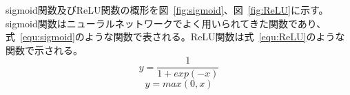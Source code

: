 sigmoid関数及びReLU関数の概形を図~\ref{fig:sigmoid}、図~\ref{fig:ReLU}に示す。sigmoid関数はニューラルネットワークでよく用いられてきた関数であり、式~\eqref{equ:sigmoid}のような関数で表される。ReLU関数は式~\eqref{equ:ReLU}のような関数で示される。
\begin{equation}
    y = \frac{1}{1+exp(-x)}
    \label{equ:sigmoid}
\end{equation}
\begin{equation}
    y = max(0,x)
    \label{equ:ReLU}
\end{equation}

